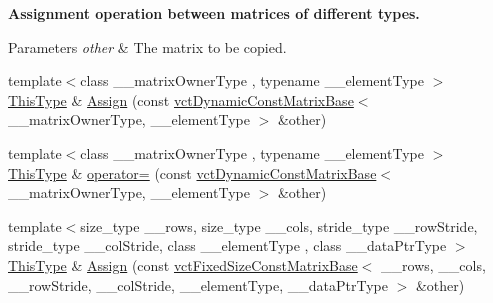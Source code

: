 \begin{Indent}{\bf Assignment operation between matrices of different types.}\par
{\em 
\begin{DoxyParams}{Parameters}
{\em other} & The matrix to be copied. \\
\hline
\end{DoxyParams}
}\begin{DoxyCompactItemize}
\item 
{\footnotesize template$<$class \+\_\+\+\_\+matrix\+Owner\+Type , typename \+\_\+\+\_\+element\+Type $>$ }\\\hyperlink{classvct_dynamic_const_matrix_base_ac4ff48cbe4d9de3fdef5a02447ffb9db}{This\+Type} \& \hyperlink{classvct_dynamic_matrix_base_af0e9859c9894141fb449a15cb0af35e8}{Assign} (const \hyperlink{classvct_dynamic_const_matrix_base}{vct\+Dynamic\+Const\+Matrix\+Base}$<$ \+\_\+\+\_\+matrix\+Owner\+Type, \+\_\+\+\_\+element\+Type $>$ \&other)
\item 
{\footnotesize template$<$class \+\_\+\+\_\+matrix\+Owner\+Type , typename \+\_\+\+\_\+element\+Type $>$ }\\\hyperlink{classvct_dynamic_const_matrix_base_ac4ff48cbe4d9de3fdef5a02447ffb9db}{This\+Type} \& \hyperlink{classvct_dynamic_matrix_base_ac9f3f19656b73d73cd97a8d4fac546be}{operator=} (const \hyperlink{classvct_dynamic_const_matrix_base}{vct\+Dynamic\+Const\+Matrix\+Base}$<$ \+\_\+\+\_\+matrix\+Owner\+Type, \+\_\+\+\_\+element\+Type $>$ \&other)
\item 
{\footnotesize template$<$size\+\_\+type \+\_\+\+\_\+rows, size\+\_\+type \+\_\+\+\_\+cols, stride\+\_\+type \+\_\+\+\_\+row\+Stride, stride\+\_\+type \+\_\+\+\_\+col\+Stride, class \+\_\+\+\_\+element\+Type , class \+\_\+\+\_\+data\+Ptr\+Type $>$ }\\\hyperlink{classvct_dynamic_const_matrix_base_ac4ff48cbe4d9de3fdef5a02447ffb9db}{This\+Type} \& \hyperlink{classvct_dynamic_matrix_base_a466a3850e96b4ab27a981edf1035d182}{Assign} (const \hyperlink{classvct_fixed_size_const_matrix_base}{vct\+Fixed\+Size\+Const\+Matrix\+Base}$<$ \+\_\+\+\_\+rows, \+\_\+\+\_\+cols, \+\_\+\+\_\+row\+Stride, \+\_\+\+\_\+col\+Stride, \+\_\+\+\_\+element\+Type, \+\_\+\+\_\+data\+Ptr\+Type $>$ \&other)
\end{DoxyCompactItemize}
\end{Indent}
